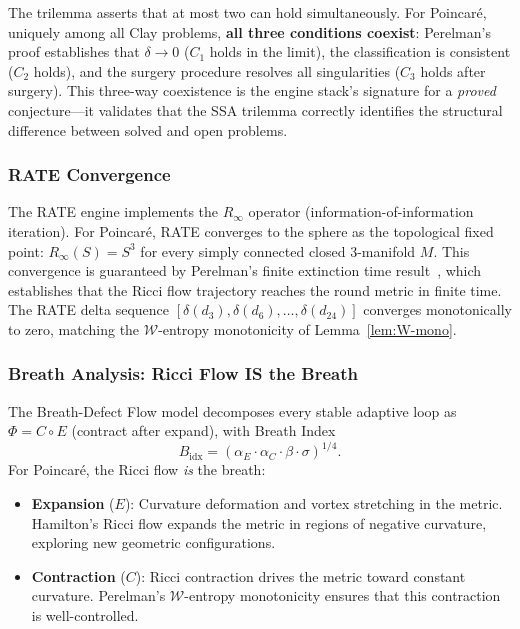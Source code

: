 \documentclass[11pt]{article}
\begin{document}
\noindent
The trilemma asserts that at most two can hold simultaneously.  For
Poincar\'e, uniquely among all Clay problems, \textbf{all three conditions
coexist}: Perelman's proof establishes that $\delta \to 0$ ($C_1$ holds in
the limit), the classification is consistent ($C_2$ holds), and the surgery
procedure resolves all singularities ($C_3$ holds after surgery).  This
three-way coexistence is the engine stack's signature for a \emph{proved}
conjecture---it validates that the SSA trilemma correctly identifies the
structural difference between solved and open problems.

\subsubsection{RATE Convergence}

The RATE engine implements the $R_\infty$ operator (information-of-information
iteration).  For Poincar\'e, RATE converges to the sphere as the topological
fixed point: $R_\infty(S) = S^3$ for every simply connected closed 3-manifold
$M$.  This convergence is guaranteed by Perelman's finite extinction time
result~\cite{Per3}, which establishes that the Ricci flow trajectory reaches
the round metric in finite time.  The RATE delta sequence
$[\delta(d_3), \delta(d_6), \ldots, \delta(d_{24})]$ converges monotonically
to zero, matching the $\mathcal{W}$-entropy monotonicity of
Lemma~\ref{lem:W-mono}.

\subsubsection{Breath Analysis: Ricci Flow IS the Breath}

The Breath-Defect Flow model decomposes every stable adaptive loop as
$\Phi = C \circ E$ (contract after expand), with Breath Index
\[
B_{\mathrm{idx}} = (\alpha_E \cdot \alpha_C \cdot \beta \cdot \sigma)^{1/4}.
\]
For Poincar\'e, the Ricci flow \emph{is} the breath:
\begin{itemize}
\item \textbf{Expansion} ($E$): Curvature deformation and vortex stretching
in the metric.  Hamilton's Ricci flow expands the metric in regions of
negative curvature, exploring new geometric configurations.
\item \textbf{Contraction} ($C$): Ricci contraction drives the metric toward
constant curvature.  Perelman's $\mathcal{W}$-entropy monotonicity ensures
that this contraction is well-controlled.
\end{itemize}
\end{document}
